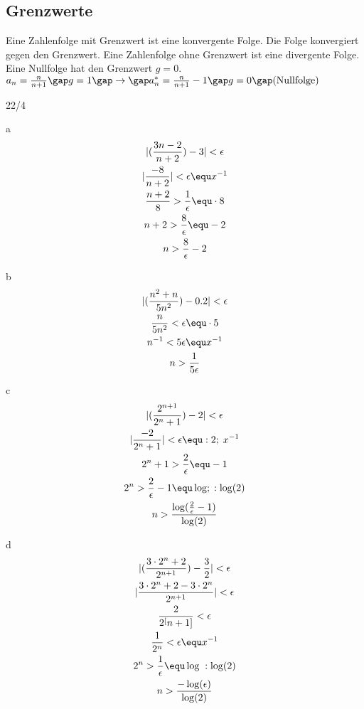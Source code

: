 \subsection{Grenzwerte}
Eine Zahlenfolge mit Grenzwert ist eine konvergente Folge. Die Folge konvergiert gegen den Grenzwert. Eine Zahlenfolge ohne Grenzwert ist eine divergente Folge. Eine Nullfolge hat den Grenzwert $g = 0$. \\
$a_n = \frac{n}{n+1}\gap g = 1\gap \rightarrow\gap a_n^\ast = \frac{n}{n+1} - 1\gap g = 0\gap \text{(Nullfolge)}$
\begin{exercise}{22/4}
  \item [a]
  \begin{gather*}
    |(\frac{3n-2}{n+2}) - 3| < \epsilon \\
    |\frac{-8}{n+2}| < \epsilon \equ x^{-1} \\
    \frac{n+2}{8} > \frac{1}{\epsilon} \equ \cdot 8 \\
    n + 2 > \frac{8}{\epsilon} \equ -2 \\
    n > \frac{8}{\epsilon} - 2
  \end{gather*}
  \item [b]
  \begin{gather*}
    |(\frac{n^2+n}{5n^2}) - 0.2| < \epsilon \\
    \frac{n}{5n^2} < \epsilon \equ \cdot 5 \\ 
    n^{-1} < 5 \epsilon \equ x^{-1} \\
    n > \frac{1}{5 \epsilon}
  \end{gather*}
  \item [c]
  \begin{gather*}
    |(\frac{2^{n + 1}}{2^n + 1}) - 2| < \epsilon \\
    |\frac{-2}{2^n + 1}| < \epsilon \equ :2;\; x^{-1} \\
    2^n + 1 > \frac{2}{\epsilon} \equ -1 \\
    2^n > \frac{2}{\epsilon} - 1 \equ \log;\; :\log(2) \\
    n > \frac{\log(\frac{2}{\epsilon} - 1)}{\log(2)}
  \end{gather*}
  \item [d]
  \begin{gather*}
    |(\frac{3 \cdot 2^n + 2}{2^{n+1}}) - \frac{3}{2}| < \epsilon \\
    |\frac{3 \cdot 2^n + 2 - 3 \cdot 2^n}{2^{n+1}}| < \epsilon \\
    \frac{2}{2^[n+1]} < \epsilon \\
    \frac{1}{2^n} < \epsilon \equ x^{-1} \\
    2^n > \frac{1}{\epsilon} \equ \log\; :\log(2) \\
    n > \frac{-\log(\epsilon)}{\log(2)}
  \end{gather*}
\end{exercise}
